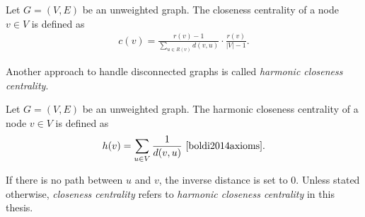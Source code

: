 \begin{definition}
\label{def:closenessGeneral}
Let $G = (V, E)$ be an unweighted graph. The closeness centrality of a node $v \in V$ is defined as
\begin{align*}
	c(v) = \frac{r(v) - 1}{\sum_{u \in R(v)}{d(v, u)}} \cdot \frac{r(v)}{|V| - 1}.
\end{align*}
\end{definition}

Another approach to handle disconnected graphs is called \emph{harmonic closeness centrality}.

\begin{definition}
\label{def:harmonicCentrality}
Let $G = (V, E)$ be an unweighted graph. The harmonic closeness centrality of a node $v \in V$ is defined as
\begin{align*}
	h(v) = \sum_{u \in V}{\frac{1}{d(v, u)}}\text{~\cite{boldi2014axioms}}.
\end{align*}
\end{definition}
If there is no path between $u$ and $v$, the inverse distance is set to $0$. Unless stated otherwise, \emph{closeness centrality} refers to \emph{harmonic closeness centrality} in this thesis.
